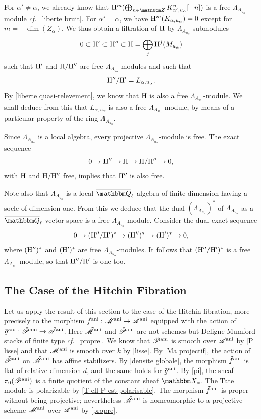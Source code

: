 \documentclass[12pt,english]{smfart}
\numberwithin{equation}{subsection}
\theoremstyle{remark}
\newcommand\calA{{\mathscr A}}
\newcommand\calP{{\mathscr P}}
\newcommand\calM{{\mathscr M}}
\newcommand\ZZ{{\mathbbm Z}}
\newcommand\QQ{{\mathbbm Q}}
\newcommand\rmH{{\rm H}}
\newcommand\bbX{{\mathbbm X}}
\newcommand\cf{{\it cf.\ }}
\newcommand\ani{{\rm ani}}
\newcommand\Ql{{\overline\QQ_\ell}}
\begin{document}
For $\alpha'\not=\alpha$, we already know that $\rmH^m(\bigoplus_{n\in\ZZ} K^n_{\alpha',u_\alpha}[-n])$ is a free $\Lambda_{A_{u_\alpha}}$-module \cf \ref{liberte bruit}. For $\alpha'=\alpha$, we have $\rmH^m(K_{\alpha,u_\alpha})=0$ except for $m=-\dim(Z_\alpha)$. We thus obtain a filtration of $\rmH$ by $\Lambda_{A_{u_\alpha}}$-submodules
$$0\subset \rmH'\subset \rmH''\subset \rmH=\bigoplus_j \rmH^j(M_{u_\alpha})$$
such that $\rmH'$ and $\rmH/\rmH''$ are free $\Lambda_{A_{u_\alpha}}$-modules and such that
$$\rmH''/\rmH'=L_{\alpha,u_\alpha}.$$
By \ref{liberte quasi-relevement}, we know that $\rmH$ is also a free $\Lambda_{A_{u_\alpha}}$-module. We shall deduce from this that $L_{\alpha,u_\alpha}$ is also a free $\Lambda_{A_{u_\alpha}}$-module, by means of a particular property of the ring $\Lambda_{A_{u_\alpha}}$.

Since $\Lambda_{A_{u_\alpha}}$ is a local algebra, every projective $\Lambda_{A_{u_\alpha}}$-module is free. The exact sequence
$$0\rightarrow \rmH''\rightarrow \rmH\rightarrow \rmH/\rmH''\rightarrow 0,$$
with $\rmH$ and $\rmH/\rmH''$ free, implies that $\rmH''$ is also free.

Note also that $\Lambda_{A_{u_\alpha}}$ is a local $\Ql$-algebra of finite dimension having a socle of dimension one. From this we deduce that the dual $(\Lambda_{A_{u_\alpha}})^*$ of $\Lambda_{A_{u_\alpha}}$ as a $\Ql$-vector space is a free $\Lambda_{A_{u_\alpha}}$-module. Consider the dual exact sequence
$$0\rightarrow (\rmH''/\rmH')^*\rightarrow (\rmH'')^*\rightarrow (\rmH')^*\rightarrow 0,$$
where $(\rmH'')^*$ and $(\rmH')^*$ are free $\Lambda_{A_{u_\alpha}}$-modules. It follows that $(\rmH''/\rmH')^*$ is a free $\Lambda_{A_{u_\alpha}}$-module, so that $\rmH''/\rmH'$ is one too.
\subsection{The Case of the Hitchin Fibration}\label{subsection : description support}

Let us apply the result of this section to the case of the Hitchin fibration, more precisely to the morphism $\tilde f^\ani:\tilde\calM^\ani\rightarrow\tilde\calA^\ani$ equipped with the action of $\tilde g^\ani:\tilde\calP^\ani\rightarrow\tilde\calA^\ani$. Here $\tilde\calM^\ani$ and $\tilde\calP^\ani$ are not schemes but Deligne-Mumford stacks of finite type \cf \ref{propre}. We know that $\tilde\calP^\ani$ is smooth over $\tilde\calA^\ani$ by \ref{P lisse} and that $\tilde\calM^\ani$ is smooth over $k$ by \ref{lisse}. By \ref{Ma projectif}, the action of $\tilde\calP^\ani$ on $\tilde\calM^\ani$ has affine stabilizers. By \ref{densite globale}, the morphism $\tilde f^\ani$ is flat of relative dimension $d$, and the same holds for $\tilde g^\ani$. By \ref{pi}, the sheaf $\pi_0(\tilde\calP^\ani)$ is a finite quotient of the constant sheaf $\bbX_*$. The Tate module is polarizable by \ref{T ell P est polarisable}. The morphism $\tilde f^\ani$ is proper without being projective; nevertheless $\tilde\calM^\ani$ is homeomorphic to a projective scheme $\bar\calM^\ani$ over $\tilde\calA^\ani$ by \ref{propre}.
\end{document}
